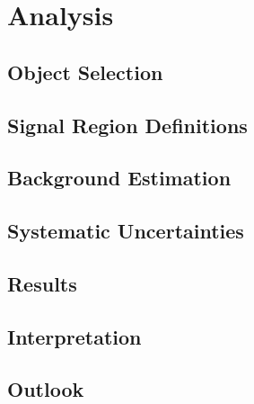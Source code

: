\chapter{Analysis}



\section{Object Selection}

\section{Signal Region Definitions}

\section{Background Estimation}


\section{Systematic Uncertainties}

\section{Results}

\section{Interpretation}

\section{Outlook}


